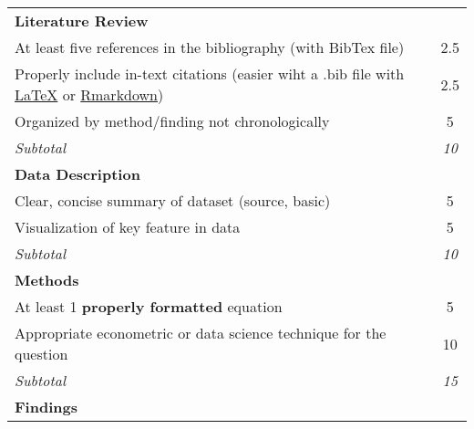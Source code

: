 \documentclass[12pt,english]{article}
\begin{document}
\begin{center}
{\begin{tabular}{l|c|c}
\hline
\textbf{Literature Review}                                                                   &               &                          \\
At least five references in the bibliography (with BibTex file)                              &               & 2.5                       \\
Properly include in-text citations (easier wiht a .bib file with \href{https://www.overleaf.com/learn/latex/Bibliography_management_with_bibtex}{LaTeX} or \href{https://bookdown.org/fmcron/Rhodes-template/bibliographies.html}{Rmarkdown})                     &               & 2.5                        \\
Organized by method/finding not chronologically                                              &               & 5                       \\
\hline
\textit{Subtotal}                                                                            &               & \textit{10}              \\
\hline
\hline
\textbf{Data Description}                                                                    &               &                          \\
Clear, concise summary of dataset (source, basic)                                            &               & 5                       \\
Visualization of key feature in data                                                         &               & 5                        \\
\hline
\textit{Subtotal}                                                                            &               & \textit{10}              \\
\hline
\hline
\textbf{Methods}                                                                        &               &                          \\
At least 1 \textbf{properly formatted} equation                                              &               & 5                        \\
Appropriate econometric or data science technique for the question                           &               & 10                       \\
\hline
\textit{Subtotal}                                                                            &               & \textit{15}              \\
\hline
\hline
\textbf{Findings}                                                                         &               &                          \\

\end{tabular}}
\end{center}
\end{document}
